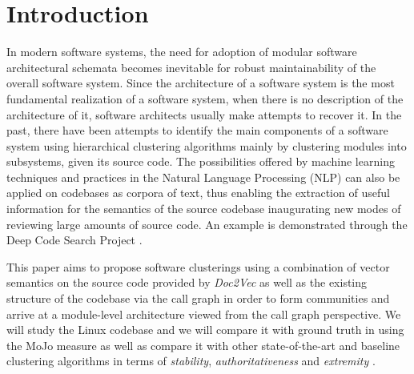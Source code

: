 \documentclass[sigconf,review, anonymous]{acmart}
\begin{document}
%



\maketitle

\section{Introduction}




In modern software systems, the need for adoption of modular software architectural schemata 
becomes inevitable for robust maintainability of the overall software system.
Since the architecture of a software system is the most fundamental realization of a 
software system, when there is no description of the architecture of it, software 
architects usually make attempts to recover it. In the past, there have been attempts to 
identify the main components of a software system using hierarchical clustering 
algorithms \cite{maqbool_overview, limbo} mainly by clustering modules into subsystems, given 
its source code.    
The possibilities offered by machine learning techniques and practices in the Natural Language Processing (NLP) 
can also be applied on codebases as corpora of text, thus enabling 
the extraction of useful information for the semantics of the source codebase 
inaugurating new modes of reviewing large amounts of source code.
An example is demonstrated through the Deep Code Search Project \cite{deepcodesearch} .

This paper aims to propose software clusterings using a combination of vector semantics on the source code provided 
by \emph{Doc2Vec} as well as the existing structure of 
the codebase via the call graph in order to form communities and arrive at a module-level 
architecture viewed from the call graph perspective. 
We will study the Linux codebase and we will compare it with ground truth in using the MoJo measure \cite{mojo} as well as 
compare it with other state-of-the-art and baseline clustering algorithms  in terms of \emph{stability}, \emph{authoritativeness} and \emph{extremity}
\cite{maqbool_overview, evaluation}.
\end{document}
